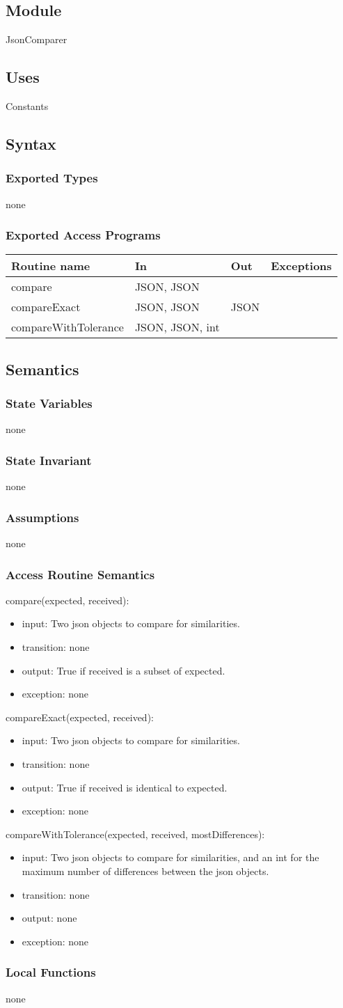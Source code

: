 \documentclass[12pt, titlepage]{article}
\newcommand{\newModule}[9]{
	\subsection* {Module}
		#1
	\subsection* {Uses}
		#2
	\subsection* {Syntax}
		\subsubsection* {Exported Types}
			#3
		\subsubsection* {Exported Access Programs}
			#4
	\subsection* {Semantics}
		\subsubsection* {State Variables}
			#5
		\subsubsection* {State Invariant}
			#6
		\subsubsection* {Assumptions}
			#7
		\subsubsection* {Access Routine Semantics}
			#8
		\subsubsection* {Local Functions}
			#9
}
\newcommand{\newAccessProgram}[5]{
	\noindent #1:
		\begin{itemize}
		    \item input: #2
			\item transition: #3
			\item output: #4
			\item exception: #5
		\end{itemize}
}
\newcommand{\row}[4]{#1 & #2 & #3 & #4 ~\\ \hline}
\newcommand{\accessProgramsTableStart}{
\begin{tabular}{| l | l | l | l |}
\hline
\textbf{Routine name} & \textbf{In} & \textbf{Out} & \textbf{Exceptions}\\
\hline
}
\newcommand{\accessProgramsTableEnd}{
	\end{tabular}
}
\begin{document}
\label{RestStub}

\newModule{JsonComparer}
	{%
		Constants
	}
	{%
		none
	}
	{%
		\accessProgramsTableStart
			\row{compare}{JSON, JSON}{}{}
			\row{compareExact}{JSON, JSON}{JSON}{}
            \row{compareWithTolerance}{JSON, JSON, int}{}{}
		\accessProgramsTableEnd
	}
	{%
		none \\

		 
	}
	{%
        none
	}
	{%
		none
	}
	{%
		\newAccessProgram{compare(expected, received)}
			{%
				Two json objects to compare for similarities.
			}
			{%
				none
			}
			{%
				True if received is a subset of expected.
			}
			{%
				none
			}
		\newAccessProgram{compareExact(expected, received)}
			{%
				Two json objects to compare for similarities.
			}
			{%
				none
			}
			{%
				True if received is identical to expected.
			}
			{%
				none
			}
		\newAccessProgram{compareWithTolerance(expected, received, mostDifferences)}
			{%
				Two json objects to compare for similarities, and an int for the maximum number of differences between the json objects.
			}
			{%
				none
			}
			{%
				none
			}
			{%
				none
			}
	}
	{%
		none
	}
	
\newpage


\end{document}
